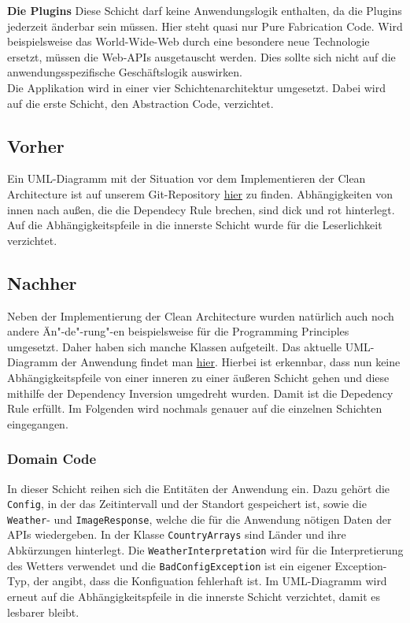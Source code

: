 \noindent
{}
\textbf{Die Plugins}
Diese Schicht darf keine Anwendungslogik enthalten, da die Plugins jederzeit änderbar sein müssen. Hier steht quasi nur Pure Fabrication Code. Wird beispielsweise das World-Wide-Web durch eine besondere neue Technologie ersetzt, müssen die Web-APIs ausgetauscht werden. Dies sollte sich nicht auf die anwendungsspezifische Geschäftslogik auswirken.\\

\noindent Die Applikation wird in einer vier Schichtenarchitektur umgesetzt. Dabei wird auf die erste Schicht, den Abstraction Code, verzichtet.
\subsection{Vorher}\label{CleanArchitectureVorher}
Ein UML-Diagramm mit der Situation vor dem Implementieren der Clean Architecture ist auf unserem Git-Repository \href{https://github.com/Bronzila/WeatherWallpaper/blob/master/CleanArchitecturePics/Architektur_Vorher.jpg}{\color{blue}hier} zu finden. Abhängigkeiten von innen nach außen, die die Dependecy Rule brechen, sind dick und rot hinterlegt. Auf die Abhängigkeitspfeile in die innerste Schicht wurde für die Leserlichkeit verzichtet.
\subsection{Nachher}
Neben der Implementierung der Clean Architecture wurden natürlich auch noch andere Än"-de"-rung"-en beispielsweise für die Programming Principles umgesetzt. Daher haben sich manche Klassen aufgeteilt. Das aktuelle UML-Diagramm der Anwendung findet man \href{https://github.com/Bronzila/WeatherWallpaper/blob/master/CleanArchitecturePics/UML_Aktuell.jpg}{\color{blue}hier}. Hierbei ist erkennbar, dass nun keine Abhängigkeitspfeile von einer inneren zu einer äußeren Schicht gehen und diese mithilfe der Dependency Inversion umgedreht wurden. Damit ist die Depedency Rule erfüllt. Im Folgenden wird nochmals genauer auf die einzelnen Schichten eingegangen.
\subsubsection{Domain Code}
In dieser Schicht reihen sich die Entitäten der Anwendung ein. Dazu gehört die \texttt{Config}, in der das Zeitintervall und der Standort gespeichert ist, sowie die \texttt{Weather}- und \texttt{ImageResponse}, welche die für die Anwendung nötigen Daten der APIs wiedergeben. In der Klasse \texttt{CountryArrays} sind Länder und ihre Abkürzungen hinterlegt. Die \texttt{WeatherInterpretation} wird für die Interpretierung des Wetters verwendet und die \texttt{BadConfigException} ist ein eigener Exception-Typ, der angibt, dass die Konfiguation fehlerhaft ist. Im UML-Diagramm wird erneut auf die Abhängigkeitspfeile in die innerste Schicht verzichtet, damit es lesbarer bleibt.
